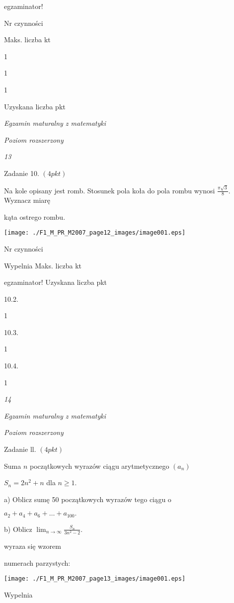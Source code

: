 \documentclass[a4paper,12pt]{article}
\begin{document}
egzaminator!

Nr czynności

Maks. liczba kt

1

1

1

Uzyskana liczba pkt





{\it Egzamin maturalny z matematyki}

{\it Poziom rozszerzony}

{\it 13}

Zadanie 10. $(4pkt)$

Na kole opisany jest romb. Stosunek pola koła do pola rombu wynosi $\displaystyle \frac{\pi\sqrt{3}}{8}$. Wyznacz miarę

kąta ostrego rombu.
\begin{center}
\texttt{[image: ./F1\_M\_PR\_M2007\_page12\_images/image001.eps]}
\end{center}
Nr czynności

Wypelnia Maks. liczba kt

egzaminator! Uzyskana liczba pkt

10.2.

1

10.3.

1

10.4.

1





{\it 14}

{\it Egzamin maturalny z matematyki}

{\it Poziom rozszerzony}

Zadanie ll. $(4pkt)$

Suma $n$ początkowych wyrazów ciągu arytmetycznego $(a_{n})$

$S_{n}=2n^{2}+n$ dla $n\geq 1.$

a) Oblicz sumę 50 początkowych wyrazów tego ciągu o

$a_{2}+a_{4}+a_{6}+\ldots+a_{100}.$

b) Oblicz $\displaystyle \lim_{n\rightarrow\infty}\frac{S_{n}}{3n^{2}-2}.$

wyraza się wzorem

numerach parzystych:
\begin{center}
\texttt{[image: ./F1\_M\_PR\_M2007\_page13\_images/image001.eps]}
\end{center}
Wypelnia
\end{document}
